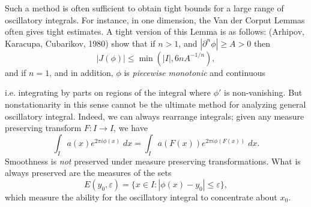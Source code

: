 


	Such a method is often sufficient to obtain tight bounds for a large range of oscillatory integrals. For instance, in one dimension, the Van der Corput Lemmas often gives tight estimates. A tight version of this Lemma is as follows: (Arhipov, Karacupa, Cubarikov, 1980) show that if $n > 1$, and $|\partial^n \phi| \geq A > 0$ then
	\[ |J(\phi)| \leq \min(|I|, 6n A^{-1/n}), \]
	and if $n = 1$, and in addition, $\phi$ is \emph{piecewise monotonic} and continuous 



	i.e. integrating by parts on regions of the integral where $\phi'$ is non-vanishing. But nonstationarity in this sense cannot be the ultimate method for analyzing general oscillatory integral. Indeed, we can always rearrange integrals; given any measure preserving transform $F: I \to I$, we have
	\[ \int_I a(x) e^{2 \pi i \phi(x)}\; dx = \int_I a(F(x)) e^{2 \pi i \phi(F(x))}\; dx. \]
	Smoothness is \emph{not} preserved under measure preserving transformations. What is always preserved are the measures of the sets
	\[ E(y_0,\varepsilon) = \{ x \in I: |\phi(x) - y_0| \leq \varepsilon \}, \]
	which measure the ability for the oscillatory integral to concentrate about $x_0$.	